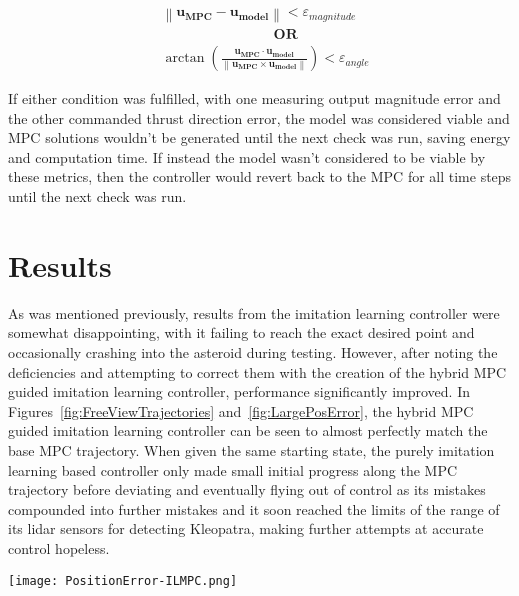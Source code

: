 \documentclass[twocolumn,letterpaper]{IEEEAerospaceCLS}
\begin{document}
\begin{equation}
\begin{aligned}
        & \left\| \mathbf{u_{MPC}} - \mathbf{u_{model}} \right\| < \varepsilon_{magnitude} \\
        & \quad\quad\quad\quad\quad\quad\quad\quad \mathbf{OR} \\
        & \arctan\left(\frac{\mathbf{u_{MPC}} \cdot \mathbf{u_{model}}}{\left\| \mathbf{u_{MPC}} \times \mathbf{u_{model}} \right\|} \right)  < \varepsilon_{angle}
\end{aligned}
\end{equation}

If either condition was fulfilled, with one measuring output magnitude error and the other commanded thrust direction error, the model was considered viable and MPC solutions wouldn't be generated until the next check was run, saving energy and computation time. If instead the model wasn't considered to be viable by these metrics, then the controller would revert back to the MPC for all time steps until the next check was run. 

\section{Results}

As was mentioned previously, results from the imitation learning controller were somewhat disappointing, with it failing to reach the exact desired point and occasionally crashing into the asteroid during testing. However, after noting the deficiencies and attempting to correct them with the creation of the hybrid MPC guided imitation learning controller, performance significantly improved. In Figures~\ref{fig:FreeViewTrajectories} and~\ref{fig:LargePosError}, the hybrid MPC guided imitation learning controller can be seen to almost perfectly match the base MPC trajectory. When given the same starting state, the purely imitation learning based controller only made small initial progress along the MPC trajectory before deviating and eventually flying out of control as its mistakes compounded into further mistakes and it soon reached the limits of the range of its lidar sensors for detecting Kleopatra, making further attempts at accurate control hopeless.

\begin{figure*}
\centering
\texttt{[image: PositionError-ILMPC.png]}
\caption{MPC guided imitation learning controller position error over time relative to MPC trajectory}
\label{fig:LargePosError}
\end{figure*}
\end{document}
